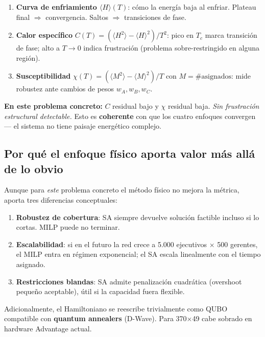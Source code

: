 \documentclass[11pt,a4paper]{article}
\begin{document}
\begin{insightbox}
\begin{enumerate}
    \item \textbf{Curva de enfriamiento $\langle H \rangle (T)$}: cómo la energía baja al enfriar. Plateau final $\Rightarrow$ convergencia. Saltos $\Rightarrow$ transiciones de fase.
    \item \textbf{Calor específico} $C(T) = (\langle H^2\rangle - \langle H\rangle^2)/T^2$: pico en $T_c$ marca transición de fase; alto a $T\to 0$ indica frustración (problema sobre-restringido en alguna región).
    \item \textbf{Susceptibilidad} $\chi(T) = (\langle M^2\rangle - \langle M\rangle^2)/T$ con $M=\#\text{asignados}$: mide robustez ante cambios de pesos $w_A, w_B, w_C$.
\end{enumerate}

\textbf{En este problema concreto:} $C$ residual bajo y $\chi$ residual baja. \emph{Sin frustración estructural detectable.} Esto es \textbf{coherente} con que los cuatro enfoques convergen --- el sistema no tiene paisaje energético complejo.
\end{insightbox}

\subsection{Por qué el enfoque físico aporta valor más allá de lo obvio}

Aunque para \emph{este} problema concreto el método físico no mejora la métrica, aporta tres diferencias conceptuales:

\begin{enumerate}
    \item \textbf{Robustez de cobertura}: SA siempre devuelve solución factible incluso si lo cortas. MILP puede no terminar.
    \item \textbf{Escalabilidad}: si en el futuro la red crece a 5.000 ejecutivos $\times$ 500 gerentes, el MILP entra en régimen exponencial; el SA escala linealmente con el tiempo asignado.
    \item \textbf{Restricciones blandas}: SA admite penalización cuadrática (overshoot pequeño aceptable), útil si la capacidad fuera flexible.
\end{enumerate}

Adicionalmente, el Hamiltoniano se reescribe trivialmente como QUBO compatible con \textbf{quantum annealers} (D-Wave). Para 370$\times$49 cabe sobrado en hardware Advantage actual.
\end{document}
